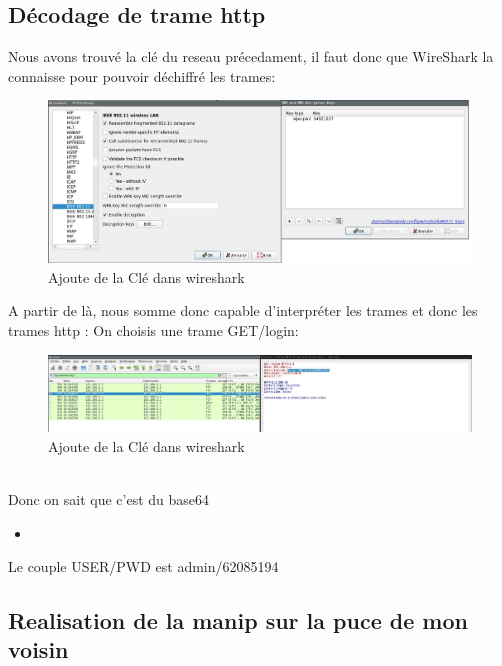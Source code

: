 \documentclass[10pt,a4paper]{article}
\newcommand{\insertcode}[2]{\begin{itemize}\item[]\end{itemize}}
\begin{document}
\subsection{Décodage de trame http}
Nous avons trouvé la clé du reseau précedament, il faut donc que WireShark la connaisse pour pouvoir déchiffré les trames:
\begin{figure}[h!]
\centering
\includegraphics[scale=0.30]{image/5.jpg}
\caption{Ajoute de la Clé dans wireshark}
\label{fig:net }
\end{figure}
A partir de là, nous somme donc capable d'interpréter les trames et donc les trames http :
On choisis une trame GET/login:
\begin{figure}[h!]
\centering
\includegraphics[scale=0.250]{image/4.jpg}
\caption{Ajoute de la Clé dans wireshark}
\label{fig:net }
\end{figure}
\\
Donc on sait que c'est du base64\\
\insertcode{code/base64.txt}{Decodage du base 64}
Le couple USER/PWD est admin/62085194

\subsection{Realisation de la manip sur la puce de mon voisin}
\end{document}
